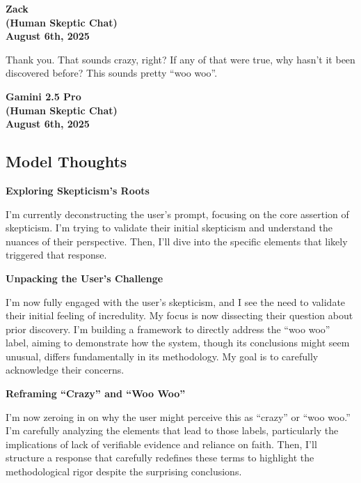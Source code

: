 \documentclass{article}
\begin{document}
\begin{center}
\textbf{Zack} \\
\textbf{(Human Skeptic Chat)} \\
\textbf{August 6th, 2025}
\end{center}



Thank you. That sounds crazy, right? If any of that were true, why
hasn't it been discovered before? This sounds pretty ``woo woo''.

\begin{center}
\textbf{Gamini 2.5 Pro} \\
\textbf{(Human Skeptic Chat)} \\
\textbf{August 6th, 2025}
\end{center}



\subsection*{Model Thoughts}\label{model-thoughts}

\textbf{Exploring Skepticism's Roots}

I'm currently deconstructing the user's prompt, focusing on the core
assertion of skepticism. I'm trying to validate their initial skepticism
and understand the nuances of their perspective. Then, I'll dive into
the specific elements that likely triggered that response.

\textbf{Unpacking the User's Challenge}

I'm now fully engaged with the user's skepticism, and I see the need to
validate their initial feeling of incredulity. My focus is now
dissecting their question about prior discovery. I'm building a
framework to directly address the ``woo woo'' label, aiming to
demonstrate how the system, though its conclusions might seem unusual,
differs fundamentally in its methodology. My goal is to carefully
acknowledge their concerns.

\textbf{Reframing ``Crazy'' and ``Woo Woo''}

I'm now zeroing in on why the user might perceive this as ``crazy'' or
``woo woo.'' I'm carefully analyzing the elements that lead to those
labels, particularly the implications of lack of verifiable evidence and
reliance on faith. Then, I'll structure a response that carefully
redefines these terms to highlight the methodological rigor despite the
surprising conclusions.
\end{document}
